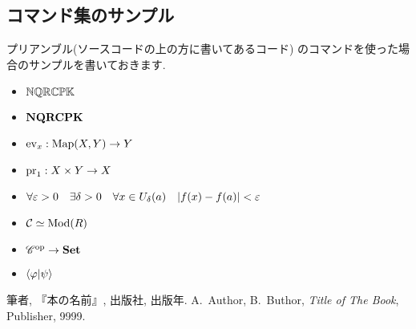 \subsection*{コマンド集のサンプル}
プリアンブル(ソースコードの上の方に書いてあるコード)
のコマンドを使った場合のサンプルを書いておきます. 
\begin{itemize}
    \item $\mathbb{N} \mathbb{Q} \mathbb{R} \mathbb{C} \mathbb{P} \mathbb{K}$
    \item $\mathbf{N} \mathbf{Q} \mathbf{R} \mathbf{C} \mathbf{P} \mathbf{K}$
    \item $\mathop{\mathrm{ev}}\nolimits_x:\mathop{\mathrm{Map}}\nolimits(X,Y)\to Y$
    \item $\mathop{\mathrm{pr}}\nolimits_1:X\times Y \to X$
    \item $\forall \varepsilon >0 \quad \exists \delta > 0 \quad 
          \forall x \in U_{\delta}(a) \quad |f(x) - f(a)| < \varepsilon$
    \item ${\mathcal C} \simeq \mathop{\mathrm{Mod}}\nolimits(R)$
    \item ${\mathscr C}^{\rm op} \to {\bf Set}$
    \item $\inner<\pphi | \psi>$
\end{itemize}





\begin{thebibliography}{20} 
     筆者, 『本の名前』, 出版社, 出版年.
     A.\ Author, B.\ Buthor, \textit{Title of The Book}, Publisher, 9999.
\end{thebibliography}





